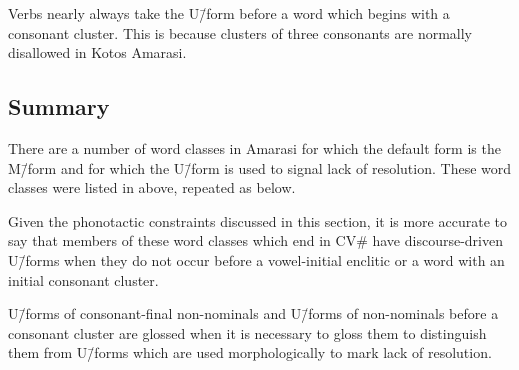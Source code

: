 Verbs nearly always take the U\=/form
before a word which begins with a consonant cluster.
This is because clusters of three consonants are
normally disallowed in Kotos Amarasi.

\subsection{Summary}
There are a number of word classes in Amarasi for which the default form is the M\=/form
and for which the U\=/form is used to signal lack of resolution.
These word classes were listed in  above,
repeated as  below.

\begin{exe}
	\label{ex:WorClaDisMet2}
		\begin{xlist}
		\end{xlist}
\end{exe}

Given the phonotactic constraints discussed in this section,
it is more accurate to say
that members of these word classes which end in CV{\#}
have discourse-driven U\=/forms when they do not occur
before a vowel-initial enclitic or a word with an initial consonant cluster.

U\=/forms of consonant-final non-nominals and U\=/forms of non-nominals
before a consonant cluster are glossed {\Uc} when it is necessary
to gloss them to distinguish them from U\=/forms which
are used morphologically to mark lack of resolution.
